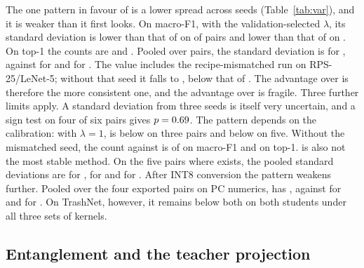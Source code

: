 \begin{table}[t]
  \centering
  \caption{Standard deviation of test macro-F1 across the three seeds. Bold: lowest of the five methods, with \Pqk at its validation-selected $\lambda$ (last column); the fixed and adaptive columns show both calibrations. The last row is the root mean square over pairs (adaptive: four pairs, \Rkd: five). $^{\S}$,$^{\P}$See Table~\ref{tab:main}.}
  \label{tab:var}
\end{table}

The one pattern in favour of \Pqk is a lower spread across seeds (Table~\ref{tab:var}), and it is weaker than it first looks.
On macro-F1, with the validation-selected $\lambda$, its standard deviation is lower than that of \Rbf on \VarBelowRbf{} of \NPairs{} pairs and lower than that of \Scratch on \VarBelowScratch{}. On top-1 the counts are \VarTopBelowRbf{} and \VarTopBelowScratch{}.
Pooled over pairs, the standard deviation is \PooledPqk{} for \Pqk, against \PooledRbf{} for \Rbf and \PooledScratch{} for \Scratch. The \Scratch value includes the recipe-mismatched run on RPS-25/LeNet-5; without that seed it falls to \PooledScratchEx{}, below that of \Pqk.
The advantage over \Rbf is therefore the more consistent one, and the advantage over \Scratch is fragile.
Three further limits apply. A standard deviation from three seeds is itself very uncertain, and a sign test on four of six pairs gives $p=0.69$. The pattern depends on the calibration: with $\lambda=1$, \Pqk is below \Scratch on three pairs and below \Rbf on five. Without the mismatched seed, the count against \Scratch is \VarBelowScratchEx{} of \NPairs{} on macro-F1 and \VarTopBelowScratchEx{} on top-1.
\Pqk is also not the most stable method. On the five pairs where \Rkd exists, the pooled standard deviations are \PooledScratchFive{} for \Scratch, \PooledRkdFive{} for \Rkd and \PooledPqkFive{} for \Pqk.
After INT8 conversion the pattern weakens further. Pooled over the four exported pairs on PC numerics, \Pqk has \IntPooledPqk{}, against \IntPooledScratch{} for \Scratch and \IntPooledRbf{} for \Rbf. On TrashNet, however, it remains below both on both students under all three sets of kernels.

\subsection{Entanglement and the teacher projection}
\label{sec:results-controls}

